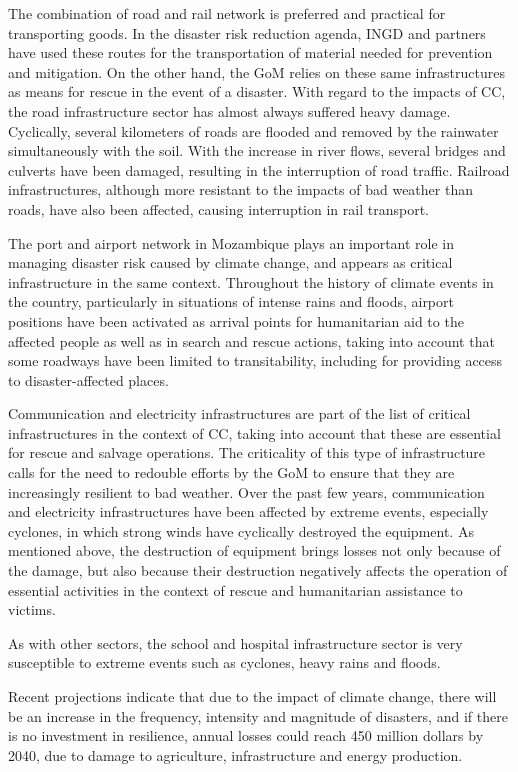 \documentclass[
]{book}
\begin{document}
The combination of road and rail network is preferred and practical for transporting goods. In the disaster risk reduction agenda, INGD and partners have used these routes for the transportation of material needed for prevention and mitigation. On the other hand, the GoM relies on these same infrastructures as means for rescue in the event of a disaster. With regard to the impacts of CC, the road infrastructure sector has almost always suffered heavy damage. Cyclically, several kilometers of roads are flooded and removed by the rainwater simultaneously with the soil. With the increase in river flows, several bridges and culverts have been damaged, resulting in the interruption of road traffic. Railroad infrastructures, although more resistant to the impacts of bad weather than roads, have also been affected, causing interruption in rail transport.

The port and airport network in Mozambique plays an important role in managing disaster risk caused by climate change, and appears as critical infrastructure in the same context. Throughout the history of climate events in the country, particularly in situations of intense rains and floods, airport positions have been activated as arrival points for humanitarian aid to the affected people as well as in search and rescue actions, taking into account that some roadways have been limited to transitability, including for providing access to disaster-affected places.

Communication and electricity infrastructures are part of the list of critical infrastructures in the context of CC, taking into account that these are essential for rescue and salvage operations. The criticality of this type of infrastructure calls for the need to redouble efforts by the GoM to ensure that they are increasingly resilient to bad weather. Over the past few years, communication and electricity infrastructures have been affected by extreme events, especially cyclones, in which strong winds have cyclically destroyed the equipment. As mentioned above, the destruction of equipment brings losses not only because of the damage, but also because their destruction negatively affects the operation of essential activities in the context of rescue and humanitarian assistance to victims.

As with other sectors, the school and hospital infrastructure sector is very susceptible to extreme events such as cyclones, heavy rains and floods.

Recent projections indicate that due to the impact of climate change, there will be an increase in the frequency, intensity and magnitude of disasters, and if there is no investment in resilience, annual losses could reach 450 million dollars by 2040, due to damage to agriculture, infrastructure and energy production.
\end{document}
